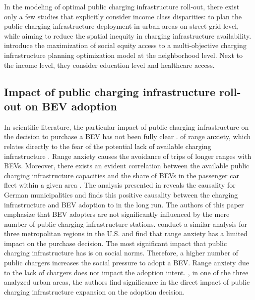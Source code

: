 \documentclass[preprint,review,11pt, authoryear]{elsarticle}
\begin{document}
    In the modeling of optimal public charging infrastructure roll-out, there exist only a few studies that explicitly consider income class disparities:  to plan the public charging infrastructure deployment in urban areas on street grid level, while aiming to reduce the spatial inequity in charging infrastructure availability. \citet{LONI2023128796} introduce the maximization of social equity access to a multi-objective charging infrastructure planning optimization model at the neighborhood level. Next to the income level, they consider education level and healthcare access.  
    
     \subsection{Impact of public charging infrastructure roll-out on BEV adoption}

     In scientific literature, the particular impact of public charging infrastructure on the decision to purchase a BEV has not been fully clear \citep{WHITE2022102663}.  of range anxiety, which relates directly to the fear of the potential lack of available charging infrastructure \citep{RAINIERI202352}. Range anxiety causes the avoidance of trips of longer ranges with BEVs. Moreover, there exists an evident correlation between the available public charging infrastructure capacities and the share of BEVs in the passenger car fleet within a given area \citep{HAUSTEIN2021112096}. The analysis presented in \citep{ILLMANN2020102413} reveals the causality for German municipalities and finds this positive causality between the charging infrastructure and BEV adoption to  in the long run. The authors of this paper emphasize that BEV adopters are not significantly influenced by the mere number of public charging infrastructure stations. \citet{WHITE2022102663} conduct a similar analysis for three metropolitan regions in the U.S. and find that range anxiety has a limited impact on the purchase decision. The most significant impact that public charging infrastructure has is on social norms. Therefore, a higher number of public chargers increases the social pressure to adopt a BEV. Range anxiety due to the lack of chargers does not impact the adoption intent. , in one of the three analyzed urban areas, the authors find significance in the direct impact of public charging infrastructure expansion on the adoption decision.  
\end{document}
